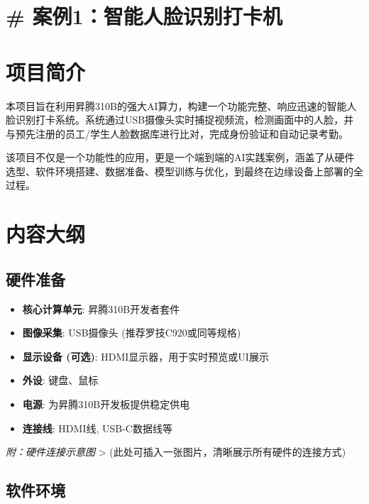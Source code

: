 \section{\#
案例1：智能人脸识别打卡机}\label{ux6848ux4f8b1ux667aux80fdux4ebaux8138ux8bc6ux522bux6253ux5361ux673a}

\section{项目简介}\label{ux9879ux76eeux7b80ux4ecb}

本项目旨在利用昇腾310B的强大AI算力，构建一个功能完整、响应迅速的智能人脸识别打卡系统。系统通过USB摄像头实时捕捉视频流，检测画面中的人脸，并与预先注册的员工/学生人脸数据库进行比对，完成身份验证和自动记录考勤。

该项目不仅是一个功能性的应用，更是一个端到端的AI实践案例，涵盖了从硬件选型、软件环境搭建、数据准备、模型训练与优化，到最终在边缘设备上部署的全过程。

\section{内容大纲}\label{ux5185ux5bb9ux5927ux7eb2}

\subsection{硬件准备}\label{ux786cux4ef6ux51c6ux5907}

\begin{itemize}
\tightlist
\item
  \textbf{核心计算单元}: 昇腾310B开发者套件
\item
  \textbf{图像采集}: USB摄像头 (推荐罗技C920或同等规格)
\item
  \textbf{显示设备 (可选)}: HDMI显示器，用于实时预览或UI展示
\item
  \textbf{外设}: 键盘、鼠标
\item
  \textbf{电源}: 为昇腾310B开发板提供稳定供电
\item
  \textbf{连接线}: HDMI线, USB-C数据线等
\end{itemize}

\emph{附：硬件连接示意图} \textgreater{}
(此处可插入一张图片，清晰展示所有硬件的连接方式)

\subsection{软件环境}\label{ux8f6fux4ef6ux73afux5883}

